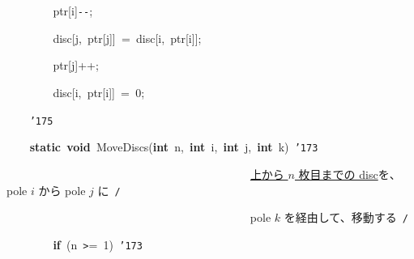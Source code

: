 \documentclass[a4paper,10pt]{article}
\def\mc{\relax}
\begin{document}
\noindent
\mbox{}{\tt\mc \ }{\tt\mc \ }{\tt\mc \ }{\tt\mc \ }{\tt\mc \ }{\tt\mc \ }{\tt\mc \ }{\tt\mc \ }ptr[i]{\tt -}{\tt -};

\noindent
\mbox{}{\tt\mc \ }{\tt\mc \ }{\tt\mc \ }{\tt\mc \ }{\tt\mc \ }{\tt\mc \ }{\tt\mc \ }{\tt\mc \ }disc[j,{\tt\mc \ }ptr[j]]{\tt\mc \ }={\tt\mc \ }disc[i,{\tt\mc \ }ptr[i]];

\noindent
\mbox{}{\tt\mc \ }{\tt\mc \ }{\tt\mc \ }{\tt\mc \ }{\tt\mc \ }{\tt\mc \ }{\tt\mc \ }{\tt\mc \ }ptr[j]++;

\noindent
\mbox{}{\tt\mc \ }{\tt\mc \ }{\tt\mc \ }{\tt\mc \ }{\tt\mc \ }{\tt\mc \ }{\tt\mc \ }{\tt\mc \ }disc[i,{\tt\mc \ }ptr[i]]{\tt\mc \ }={\tt\mc \ }0;

\noindent
\mbox{}{\tt\mc \ }{\tt\mc \ }{\tt\mc \ }{\tt\mc \ }{\tt\char'175}

\noindent
\mbox{}\hfill

\noindent
\mbox{}{\tt\mc \ }{\tt\mc \ }{\tt\mc \ }{\tt\mc \ }\textbf{static}{\tt\mc \ }\textbf{void}{\tt\mc \ }MoveDiscs(\textbf{int}{\tt\mc \ }n,{\tt\mc \ }\textbf{int}{\tt\mc \ }i,{\tt\mc \ }\textbf{int}{\tt\mc \ }j,{\tt\mc \ }\textbf{int}{\tt\mc \ }k){\tt\mc \ }{\tt\char'173}

\noindent
\mbox{}{\tt\mc \ }{\tt\mc \ }{\tt\mc \ }{\tt\mc \ }{\tt\mc \ }{\tt\mc \ }{\tt\mc \ }{\tt\mc \ }{\tt\mc \ }{\tt\mc \ }{\tt\mc \ }{\tt\mc \ }{\tt\mc \ }{\tt\mc \ }{\tt\mc \ }{\tt\mc \ }{\tt\mc \ }{\tt\mc \ }{\tt\mc \ }{\tt\mc \ }{\tt\mc \ }{\tt\mc \ }{\tt\mc \ }{\tt\mc \ }{\tt\mc \ }{\tt\mc \ }{\tt\mc \ }{\tt\mc \ }{\tt\mc \ }{\tt\mc \ }{\tt\mc \ }{\tt\mc \ }{\tt\mc \ }{\tt\mc \ }{\tt\mc \ }{\tt\mc \ }{\tt\mc \ }{\tt\mc \ }{\tt\mc \ }{\tt\mc \ }\rm\mc {\tt /}{\tt *}\  \ \underline{\textsf{上から $n$ 枚目までの disc}}を、pole $i$ から pole $j$ に\hfill \rm\mc \ {\tt *}{\tt /}
\tt\mc 

\noindent
\mbox{}{\tt\mc \ }{\tt\mc \ }{\tt\mc \ }{\tt\mc \ }{\tt\mc \ }{\tt\mc \ }{\tt\mc \ }{\tt\mc \ }{\tt\mc \ }{\tt\mc \ }{\tt\mc \ }{\tt\mc \ }{\tt\mc \ }{\tt\mc \ }{\tt\mc \ }{\tt\mc \ }{\tt\mc \ }{\tt\mc \ }{\tt\mc \ }{\tt\mc \ }{\tt\mc \ }{\tt\mc \ }{\tt\mc \ }{\tt\mc \ }{\tt\mc \ }{\tt\mc \ }{\tt\mc \ }{\tt\mc \ }{\tt\mc \ }{\tt\mc \ }{\tt\mc \ }{\tt\mc \ }{\tt\mc \ }{\tt\mc \ }{\tt\mc \ }{\tt\mc \ }{\tt\mc \ }{\tt\mc \ }{\tt\mc \ }{\tt\mc \ }\rm\mc {\tt /}{\tt *}\  \ pole $k$ を経由して、移動する\hfill \rm\mc \ {\tt *}{\tt /}
\tt\mc 

\noindent
\mbox{}{\tt\mc \ }{\tt\mc \ }{\tt\mc \ }{\tt\mc \ }{\tt\mc \ }{\tt\mc \ }{\tt\mc \ }{\tt\mc \ }\textbf{if}{\tt\mc \ }(n{\tt\mc \ }{\tt >}={\tt\mc \ }1){\tt\mc \ }{\tt\char'173}
\end{document}
